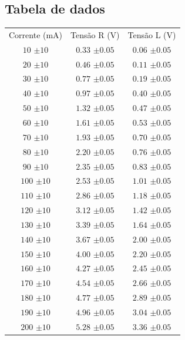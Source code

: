 \documentclass[12pt,twoside, a4paper, twocolumn]{article}
\begin{document}
\subsection{Tabela de dados}
\begin{center}
    \begin{tabular}{ |ccc| }
        \hline
        Corrente (mA) & Tensão R (V)     & Tensão L (V)     \\
        $10$ $\pm10$  & $0.33$ $\pm0.05$ & $0.06$ $\pm0.05$ \\
        $20$ $\pm10$  & $0.46$ $\pm0.05$ & $0.11$ $\pm0.05$ \\
        $30$ $\pm10$  & $0.77$ $\pm0.05$ & $0.19$ $\pm0.05$ \\
        $40$ $\pm10$  & $0.97$ $\pm0.05$ & $0.40$ $\pm0.05$ \\
        $50$ $\pm10$  & $1.32$ $\pm0.05$ & $0.47$ $\pm0.05$ \\
        $60$ $\pm10$  & $1.61$ $\pm0.05$ & $0.53$ $\pm0.05$ \\
        $70$ $\pm10$  & $1.93$ $\pm0.05$ & $0.70$ $\pm0.05$ \\
        $80$ $\pm10$  & $2.20$ $\pm0.05$ & $0.76$ $\pm0.05$ \\
        $90$ $\pm10$  & $2.35$ $\pm0.05$ & $0.83$ $\pm0.05$ \\
        $100$ $\pm10$ & $2.53$ $\pm0.05$ & $1.01$ $\pm0.05$ \\
        $110$ $\pm10$ & $2.86$ $\pm0.05$ & $1.18$ $\pm0.05$ \\
        $120$ $\pm10$ & $3.12$ $\pm0.05$ & $1.42$ $\pm0.05$ \\
        $130$ $\pm10$ & $3.39$ $\pm0.05$ & $1.64$ $\pm0.05$ \\
        $140$ $\pm10$ & $3.67$ $\pm0.05$ & $2.00$ $\pm0.05$ \\
        $150$ $\pm10$ & $4.00$ $\pm0.05$ & $2.20$ $\pm0.05$ \\
        $160$ $\pm10$ & $4.27$ $\pm0.05$ & $2.45$ $\pm0.05$ \\
        $170$ $\pm10$ & $4.54$ $\pm0.05$ & $2.66$ $\pm0.05$ \\
        $180$ $\pm10$ & $4.77$ $\pm0.05$ & $2.89$ $\pm0.05$ \\
        $190$ $\pm10$ & $4.96$ $\pm0.05$ & $3.04$ $\pm0.05$ \\
        $200$ $\pm10$ & $5.28$ $\pm0.05$ & $3.36$ $\pm0.05$ \\


        \hline
    \end{tabular}
\end{center}
\end{document}
